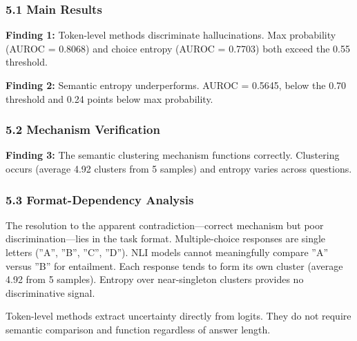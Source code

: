 
\subsubsection{5.1 Main Results}

\begin{table}[htbp]
\centering
{}
\end{table}

\textbf{Finding 1:} Token-level methods discriminate hallucinations. Max probability (AUROC = 0.8068) and choice entropy (AUROC = 0.7703) both exceed the 0.55 threshold.

\textbf{Finding 2:} Semantic entropy underperforms. AUROC = 0.5645, below the 0.70 threshold and 0.24 points below max probability.

\subsubsection{5.2 Mechanism Verification}

\begin{table}[htbp]
\centering
{}
\end{table}

\textbf{Finding 3:} The semantic clustering mechanism functions correctly. Clustering occurs (average 4.92 clusters from 5 samples) and entropy varies across questions.

\subsubsection{5.3 Format-Dependency Analysis}

The resolution to the apparent contradiction---correct mechanism but poor discrimination---lies in the task format. Multiple-choice responses are single letters (''A'', ''B'', ''C'', ''D''). NLI models cannot meaningfully compare ''A'' versus ''B'' for entailment. Each response tends to form its own cluster (average 4.92 from 5 samples). Entropy over near-singleton clusters provides no discriminative signal.

Token-level methods extract uncertainty directly from logits. They do not require semantic comparison and function regardless of answer length.

